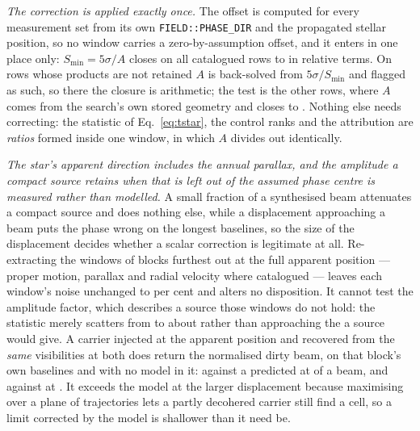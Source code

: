 \emph{The correction is applied exactly once.} The offset is computed for
every measurement set from its own \texttt{FIELD::PHASE\_DIR} and the
propagated stellar position, so no window carries a zero-by-assumption
offset, and it enters in one place only: $S_{\min}=5\sigma/A$ closes on all
\PbSminClosed{} catalogued rows to \PbSminWorstRes{} in relative terms. On
\PbSminTaut{} rows whose products are not retained $A$ is back-solved from
$5\sigma/S_{\min}$ and flagged as such, so there the closure is arithmetic;
the test is the other \PbSminIndep{} rows, where $A$ comes from the search's
own stored geometry and closes to \PbSminIndepRes. Nothing else needs
correcting: the statistic of
Eq.~\ref{eq:tstar}, the control ranks and the attribution are \emph{ratios}
formed inside one window, in which $A$ divides out identically.

\emph{The star's apparent direction includes the annual parallax, and the
amplitude a compact source retains when that is left out of the assumed phase
centre is measured rather than modelled.} A small fraction of a synthesised
beam attenuates a compact source and does nothing else, while a displacement
approaching a beam puts the phase wrong on the longest baselines, so the size
of the displacement decides whether a scalar correction is legitimate at all.
Re-extracting the \SensNReextWin{} windows of \SensNReextBlock{} blocks
furthest out at the full apparent position --- proper motion, parallax and
radial velocity where catalogued --- leaves each window's noise unchanged to
\SensReextNoiseMaxPct{} per cent and alters no disposition. It cannot test the
amplitude factor, which describes a source those windows do not hold: the
statistic merely scatters from \SensReTstarLo{} to \SensReTstarHi{} about
\SensReTstarMed{} rather than approaching the \SensPxLargePred{} a source
would give. A carrier injected at the apparent position and recovered from the
\emph{same} visibilities at both does return the normalised dirty beam, on
that block's own baselines and with no model in it: \SensPxSmallMeas{} against
a predicted \SensPxSmallPred{} at \SensPxSmallBeams{} of a beam, and
\SensPxLargeMeas{} against \SensPxLargePred{} at \SensPxLargeBeams. It
exceeds the model at the larger displacement because maximising over a plane
of trajectories lets a partly decohered carrier still find a cell, so a limit
corrected by the model is shallower than it need be.

